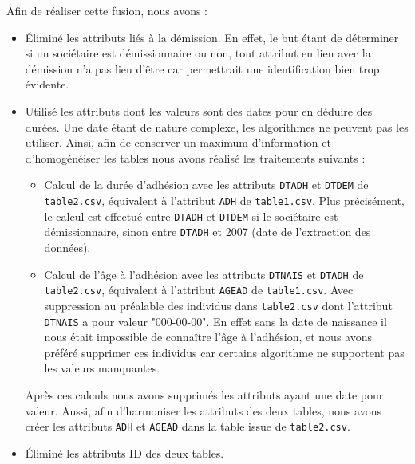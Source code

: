 \documentclass{ceri/sty/rapport}
\begin{document}
Afin de réaliser cette fusion, nous avons :\\
\begin{itemize}
    \item Éliminé les attributs liés à la démission. En effet, le but étant de déterminer si un sociétaire est démissionnaire ou non, tout attribut en lien avec la démission n'a pas lieu d'être car permettrait une identification bien trop évidente.\\
    
    \item Utilisé les attributs dont les valeurs sont des dates pour en déduire des durées. Une date étant de nature complexe, les algorithmes ne peuvent pas les utiliser. Ainsi, afin de conserver un maximum d'information et d'homogénéiser les tables nous avons réalisé les traitements suivants :\\
    
    \begin{itemize}
        \item Calcul de la durée d'adhésion avec les attributs \texttt{DTADH} et \texttt{DTDEM} de \texttt{table2.csv}, équivalent à l'attribut \texttt{ADH} de \texttt{table1.csv}. Plus précisément, le calcul est effectué entre \texttt{DTADH} et \texttt{DTDEM} si le sociétaire est démissionnaire, sinon entre \texttt{DTADH} et 2007 (date de l'extraction des données).\\
        
        \item Calcul de l'âge à l'adhésion avec les attributs \texttt{DTNAIS} et \texttt{DTADH} de \texttt{table2.csv}, équivalent à l'attribut \texttt{AGEAD} de \texttt{table1.csv}. Avec suppression au préalable des individus dans \texttt{table2.csv} dont l'attribut \texttt{DTNAIS} a pour valeur "000-00-00". En effet sans la date de naissance il nous était impossible de connaître l'âge à l'adhésion, et nous avons préféré supprimer ces individus car certains algorithme ne supportent pas les valeurs manquantes.
    \end{itemize}
    Après ces calculs nous avons supprimés les attributs ayant une date pour valeur. Aussi, afin d'harmoniser les attributs des deux tables, nous avons créer les attributs \texttt{ADH} et \texttt{AGEAD} dans la table issue de \texttt{table2.csv}.\\
    
    \item Éliminé les attributs ID des deux tables.\\
    

\end{itemize}
\end{document}
